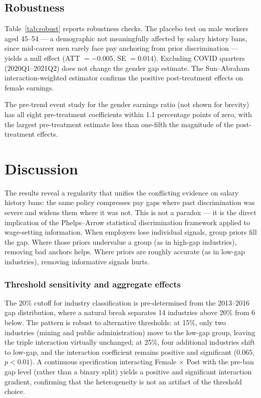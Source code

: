 \documentclass[12pt]{article}
\begin{document}
\subsection{Robustness}



Table~\ref{tab:robust} reports robustness checks. The placebo test on male workers aged 45--54 --- a demographic not meaningfully affected by salary history bans, since mid-career men rarely face pay anchoring from prior discrimination --- yields a null effect (ATT $= -0.005$, SE $= 0.014$). Excluding COVID quarters (2020Q1--2021Q2) does not change the gender gap estimate. The Sun--Abraham interaction-weighted estimator confirms the positive post-treatment effects on female earnings.

The pre-trend event study for the gender earnings ratio (not shown for brevity) has all eight pre-treatment coefficients within 1.1 percentage points of zero, with the largest pre-treatment estimate less than one-fifth the magnitude of the post-treatment effects.


\section{Discussion}
\label{sec:discussion}

The results reveal a regularity that unifies the conflicting evidence on salary history bans: the same policy compresses pay gaps where past discrimination was severe and widens them where it was not. This is not a paradox --- it is the direct implication of the Phelps--Arrow statistical discrimination framework applied to wage-setting information. When employers lose individual signals, group priors fill the gap. Where those priors undervalue a group (as in high-gap industries), removing bad anchors helps. Where priors are roughly accurate (as in low-gap industries), removing informative signals hurts.

\subsubsection*{Threshold sensitivity and aggregate effects} The 20\% cutoff for industry classification is pre-determined from the 2013--2016 gap distribution, where a natural break separates 14 industries above 20\% from 6 below. The pattern is robust to alternative thresholds: at 15\%, only two industries (mining and public administration) move to the low-gap group, leaving the triple interaction virtually unchanged; at 25\%, four additional industries shift to low-gap, and the interaction coefficient remains positive and significant (0.065, $p < 0.01$). A continuous specification interacting Female $\times$ Post with the pre-ban gap level (rather than a binary split) yields a positive and significant interaction gradient, confirming that the heterogeneity is not an artifact of the threshold choice.
\end{document}
